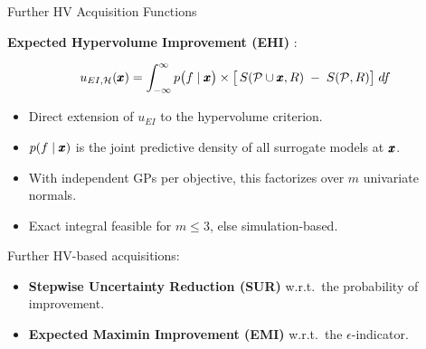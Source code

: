 \documentclass[11pt,compress,t,notes=noshow,xcolor=table]{beamer}
\begin{document}
\begin{vbframe}{Further HV Acquisition Functions}

\textbf{Expected Hypervolume Improvement (EHI)} 
:

\[
u_{EI, \mathcal{H}}(\pmb{x}) 
  = \int_{-\infty}^{\infty} p\bigl(f \mid \pmb{x}\bigr)
    \times \bigl[\,
        S(\mathcal{P} \cup \pmb{x}, R) \;-\; S(\mathcal{P}, R)
    \bigr]\; df
\]

\begin{itemize}
  \item Direct extension of $u_{EI}$ to the hypervolume criterion.
  \item $p(f \mid \pmb{x})$ is the joint predictive density of all surrogate models at $\pmb{x}$.
  \item With independent GPs per objective, this factorizes over $m$ univariate normals.
  \item Exact integral feasible for $m \le 3$, else simulation-based.
\end{itemize}

\medskip
Further HV-based acquisitions:
\begin{itemize}
  \item \textbf{Stepwise Uncertainty Reduction (SUR)} w.r.t.\ the probability of improvement.
  \item \textbf{Expected Maximin Improvement (EMI)} w.r.t.\ the $\epsilon$-indicator.
\end{itemize}

\end{vbframe}
\end{document}
